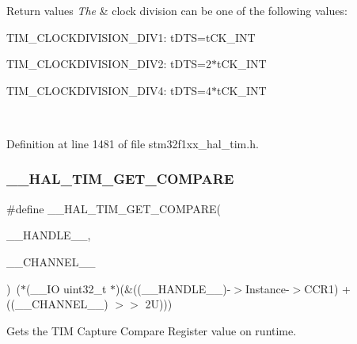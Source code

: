 \begin{DoxyRetVals}{Return values}
{\em The} & clock division can be one of the following values\+: \begin{DoxyItemize}
\item T\+I\+M\+\_\+\+C\+L\+O\+C\+K\+D\+I\+V\+I\+S\+I\+O\+N\+\_\+\+D\+I\+V1\+: t\+D\+TS=t\+C\+K\+\_\+\+I\+NT \item T\+I\+M\+\_\+\+C\+L\+O\+C\+K\+D\+I\+V\+I\+S\+I\+O\+N\+\_\+\+D\+I\+V2\+: t\+D\+TS=2$\ast$t\+C\+K\+\_\+\+I\+NT \item T\+I\+M\+\_\+\+C\+L\+O\+C\+K\+D\+I\+V\+I\+S\+I\+O\+N\+\_\+\+D\+I\+V4\+: t\+D\+TS=4$\ast$t\+C\+K\+\_\+\+I\+NT \end{DoxyItemize}
\\
\hline
\end{DoxyRetVals}


Definition at line 1481 of file stm32f1xx\+\_\+hal\+\_\+tim.\+h.

\mbox{\label{group___t_i_m___exported___macros_gaa40722f56910966e1da5241b610eed84}} 
\subsubsection{\texorpdfstring{\+\_\+\+\_\+\+H\+A\+L\+\_\+\+T\+I\+M\+\_\+\+G\+E\+T\+\_\+\+C\+O\+M\+P\+A\+RE}{\_\_HAL\_TIM\_GET\_COMPARE}}
{\footnotesize\ttfamily \#define \+\_\+\+\_\+\+H\+A\+L\+\_\+\+T\+I\+M\+\_\+\+G\+E\+T\+\_\+\+C\+O\+M\+P\+A\+RE(\begin{DoxyParamCaption}\item[{}]{\+\_\+\+\_\+\+H\+A\+N\+D\+L\+E\+\_\+\+\_\+,  }\item[{}]{\+\_\+\+\_\+\+C\+H\+A\+N\+N\+E\+L\+\_\+\+\_\+ }\end{DoxyParamCaption})~($\ast$(\+\_\+\+\_\+\+IO uint32\+\_\+t $\ast$)(\&((\+\_\+\+\_\+\+H\+A\+N\+D\+L\+E\+\_\+\+\_\+)-\/$>$Instance-\/$>$C\+C\+R1) + ((\+\_\+\+\_\+\+C\+H\+A\+N\+N\+E\+L\+\_\+\+\_\+) $>$$>$ 2\+U)))}



Gets the T\+IM Capture Compare Register value on runtime. 


